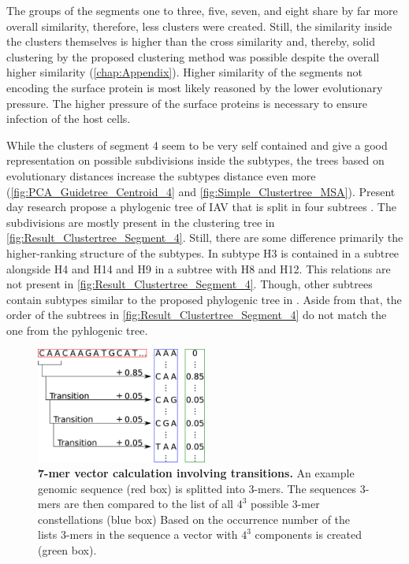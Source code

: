 \vspace{1em}

The groups of the segments one to three, five, seven, and eight share by far more overall similarity, therefore, less clusters were created. Still, the similarity inside the clusters themselves is higher than the cross similarity and, thereby, solid clustering by the proposed clustering method was possible despite the overall higher similarity (\autoref{chap:Appendix}). Higher similarity of the segments not encoding the surface protein is most likely reasoned by the lower evolutionary pressure. The higher pressure of the surface proteins is necessary to ensure infection of the host cells. 

\vspace{1em}

While the clusters of segment 4 seem to be very self contained and give a good representation on possible subdivisions inside the subtypes, the trees based on evolutionary distances increase the subtypes distance even more (\autoref{fig:PCA_Guidetree_Centroid_4} and \autoref{fig:Simple_Clustertree_MSA}). Present day research propose a phylogenic tree of \gls{IAV} that is split in four subtrees \autocite{wei_next-generation_2020}. The subdivisions are mostly present in the clustering tree in \autoref{fig:Result_Clustertree_Segment_4}. Still, there are some difference primarily the higher-ranking structure of the subtypes. In \textcite{wei_next-generation_2020} subtype H3 is contained in a subtree alongside H4 and H14 and H9 in a subtree with H8 and H12. This relations are not present in \autoref{fig:Result_Clustertree_Segment_4}. Though, other subtrees contain subtypes similar to the proposed phylogenic tree in \textcite{wei_next-generation_2020}. Aside from that, the order of the subtrees in \autoref{fig:Result_Clustertree_Segment_4} do not match the one from the pyhlogenic tree.

\begin{figure}[!hbt]
    \centering
    \includegraphics[width=0.5\textwidth]{Graphics/Transition.pdf}
    \caption[7-mer vector calculation involving transitions]{\textbf{7-mer vector calculation involving transitions.} An example genomic sequence (red box) is splitted into 3-mers. The sequences 3-mers are then compared to the list of all $4^3$ possible 3-mer constellations (blue box) Based on the occurrence number of the lists 3-mers in the sequence a vector with $4^3$ components is created (green box).}
    \label{fig:trans}
\end{figure}

